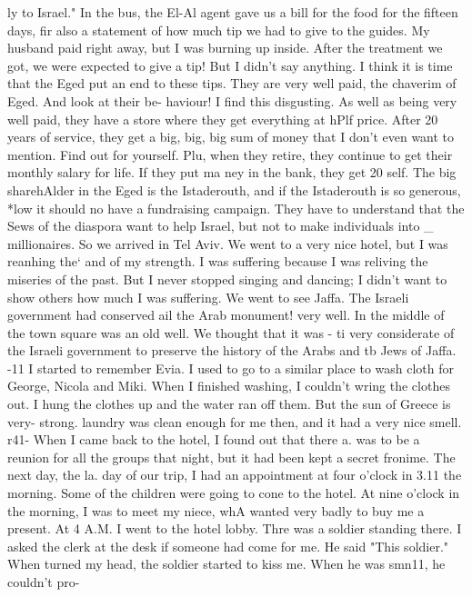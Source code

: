 ly to Israel." 
In the bus, the El-Al agent gave us a bill for the food for the fifteen days, fir 
also a statement of how much tip we had to give to the guides. My husband paid right 
away, but I was burning up inside. After the treatment we got, we were expected to 
give a tip! But I didn't say anything. I think it is time that the Eged put an end 
to these tips. They are very well paid, the chaverim of Eged. And look at their be-
haviour! I find this disgusting. As well as being very well paid, they have a store 
where they get everything at hPlf price. After 20 years of service, they get a big, 
big, big sum of money that I don't even want to mention. Find out for yourself. Plu, 
when they retire, they continue to get their monthly salary for life. If they put ma 
ney in the bank, they get 20%
self. The big sharehAlder in the Eged is the Istaderouth, and if the Istaderouth is 
so generous, *low it should no have a fundraising campaign. They have to understand 
that the Sews of the diaspora want to help Israel, but not to make individuals into _ 
millionaires. 
So we arrived in Tel Aviv. We went to a very nice hotel, but I was reanhing the` 
and of my strength. I was suffering because I was reliving the miseries of the past. 
But I never stopped singing and dancing; I didn't want to show others how much I was 
suffering. 
We went to see Jaffa. The Israeli government had conserved ail the Arab monument! 
very well. In the middle of the town square was an old well. We thought that it was - 
ti 
very considerate of the Israeli government to preserve the history of the Arabs and tb 
Jews of Jaffa. 
-11 
I started to remember Evia. I used to go to a similar place to wash cloth 
for George, Nicola and Miki. When I finished washing, I couldn't wring the clothes 
out. I hung the clothes up and the water ran off them. But the sun of Greece is very-
strong. 
laundry was clean enough for me then, and it had a very nice smell. 
r41- 
When I came back to the hotel, I found out that there a. was to be a reunion for 
all the groups that night, but it had been kept a secret fronime. The next day, the la. 
day of our trip, I had an appointment at four o'clock in 3.11 the morning. Some of the 
children were going to cone to the hotel. At nine o'clock in the morning, I was to 
meet my niece, whA wanted very badly to buy me a present. 
At 4 A.M. I went to the hotel lobby. Thre was a soldier standing there. I asked 
the clerk at the desk if someone had come for me. He said "This soldier." When 
turned my head, the soldier started to kiss me. When he was smn11, he couldn't pro-
